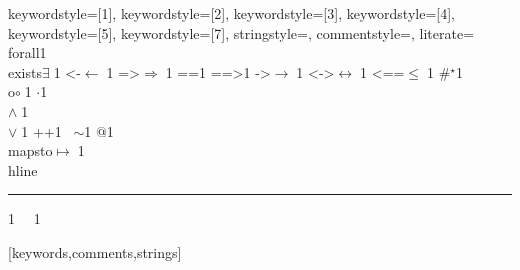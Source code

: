 {	%
	keywordstyle=[1]{\bfseries\footnotesize\listingsttfamily\color{dkviolet}},
	keywordstyle=[2]{\bfseries\footnotesize\listingsttfamily\color{dkgreen}},
	keywordstyle=[3]{\bfseries\footnotesize\listingsttfamily\color{ltblue}},
	keywordstyle=[4]{\bfseries\footnotesize\listingsttfamily\color{blue}},
	keywordstyle=[5]{\footnotesize\listingsttfamily\color{red}},
	keywordstyle=[7]{\bfseries\footnotesize\listingsttfamily\color{BrickRed}},
	stringstyle=\footnotesize\listingsttfamily,
	commentstyle={\footnotesize\listingsttfamily\color{dkgreen}},
	literate=
	{\\forall}{{\color{dkgreen}{$\forall\;$}}}1
	{\\exists}{{$\exists\;$}}1
	{<-}{{$\leftarrow\;$}}1
	{=>}{{$\Rightarrow\;$}}1
	{==}{{\code{==}\;}}1
	{==>}{{\code{==>}\;}}1
	{->}{{$\rightarrow\;$}}1
	{<->}{{$\leftrightarrow\;$}}1
	{<==}{{$\leq\;$}}1
	{\#}{{$^\star$}}1
	{\\o}{{$\circ\;$}}1
	{\@}{{$\cdot$}}1
	{\/\\}{{$\wedge\;$}}1
	{\\\/}{{$\vee\;$}}1
	{++}{{\code{++}}}1
	{~}{{$\sim$}}1
	{\@\@}{{$@$}}1
	{\\mapsto}{{$\mapsto\;$}}1
	{\\hline}{{\rule{\linewidth}{0.5pt}}}1
    {\ }{{\ }}1
}[keywords,comments,strings]
